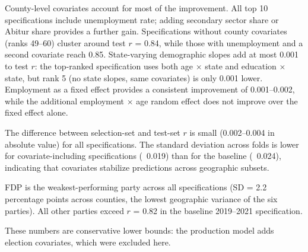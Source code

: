 \documentclass[11pt]{article}
\begin{document}
County-level covariates account for most of the improvement. All top 10 specifications include unemployment rate; adding secondary sector share or Abitur share provides a further gain. Specifications without county covariates (ranks 49--60) cluster around test $r$ = 0.84, while those with unemployment and a second covariate reach 0.85. State-varying demographic slopes add at most 0.001 to test $r$: the top-ranked specification uses both age $\times$ state and education $\times$ state, but rank 5 (no state slopes, same covariates) is only 0.001 lower. Employment as a fixed effect provides a consistent improvement of 0.001--0.002, while the additional employment $\times$ age random effect does not improve over the fixed effect alone.

The difference between selection-set and test-set $r$ is small (0.002--0.004 in absolute value) for all specifications. The standard deviation across folds is lower for covariate-including specifications (~0.019) than for the baseline (~0.024), indicating that covariates stabilize predictions across geographic subsets.

FDP is the weakest-performing party across all specifications (SD = 2.2 percentage points across counties, the lowest geographic variance of the six parties). All other parties exceed $r$ = 0.82 in the baseline 2019--2021 specification.

These numbers are conservative lower bounds: the production model adds election covariates, which were excluded here.
\end{document}
